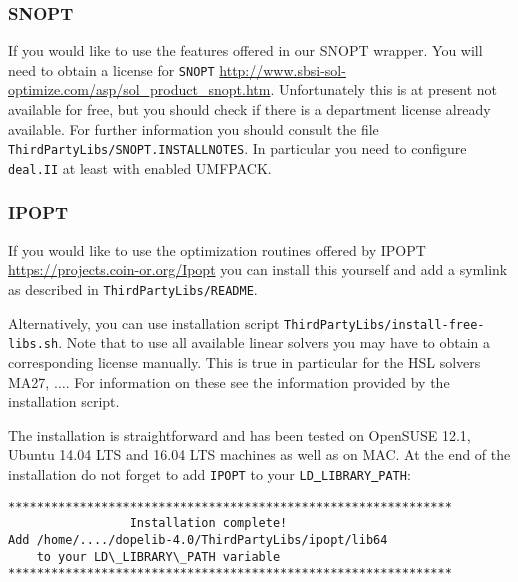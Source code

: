 \subsubsection{SNOPT}
If you would like to use the features offered in our SNOPT wrapper. You will 
need to obtain a license for \texttt{SNOPT} 
\url{http://www.sbsi-sol-optimize.com/asp/sol_product_snopt.htm}.
Unfortunately this is at present not available for free, but you should 
check if 
there is a department license already available.
For further information you should consult the file 
\texttt{ThirdPartyLibs/SNOPT.INSTALLNOTES}. In particular you need to configure 
\texttt{deal.II} at least with enabled UMFPACK.




\subsubsection{IPOPT}
If you would like to use the optimization routines offered by IPOPT
\url{https://projects.coin-or.org/Ipopt} you can  
install this yourself and add a symlink as described in \texttt{ThirdPartyLibs/README}.

Alternatively, you can use installation script
\texttt{ThirdPartyLibs/install-free-libs.sh}. Note that to use all 
available linear solvers you may have to obtain a corresponding license 
manually. This is true in particular for the HSL solvers MA27, $\ldots$.
For information on these see the information provided by the installation
script.

The installation is straightforward and has been tested on OpenSUSE
12.1, Ubuntu 14.04 LTS and 16.04 LTS
machines as well as on MAC. At the end of the installation do not forget to
add \texttt{IPOPT} to your \texttt{LD\underline{ }LIBRARY\underline{ }PATH}:
\begin{lstlisting}
**************************************************************
                 Installation complete!
Add /home/..../dopelib-4.0/ThirdPartyLibs/ipopt/lib64
    to your LD\_LIBRARY\_PATH variable
**************************************************************
\end{lstlisting}


